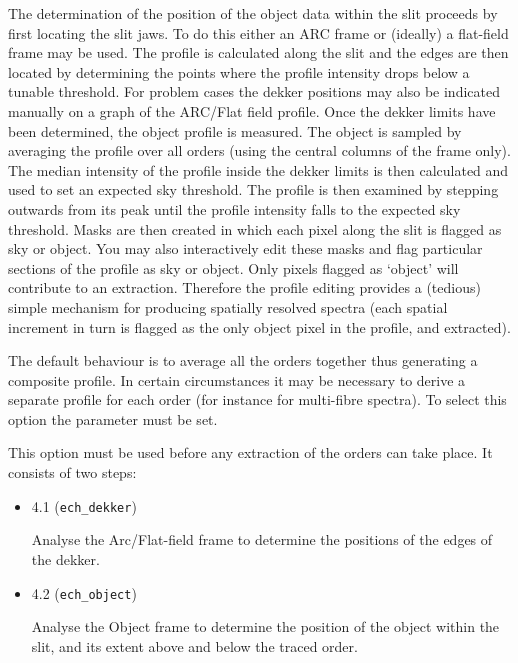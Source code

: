 The determination of the position of the object data within the slit
proceeds by first locating the slit jaws. To do this either an ARC frame
or (ideally) a flat-field frame may be used. The profile is calculated
along the slit and the edges are then located by determining the points
where the profile intensity drops below a tunable threshold. For
problem cases the dekker positions may also be indicated manually on a
graph of the ARC/Flat field profile.
Once the dekker limits have been determined, the object profile is
measured. The object is sampled by averaging the profile over all orders
(using the central columns of the frame only). The median intensity of
the profile inside the dekker limits is then calculated and used to set
an expected sky threshold. The profile is then examined by stepping
outwards from its peak until the profile intensity falls to the expected
sky threshold.
Masks are then created in which
each pixel along the slit is flagged as sky or object. You may also
interactively edit these masks and flag particular sections of the
profile as sky or object. Only pixels flagged as `object' will
contribute to an extraction.
Therefore the profile editing provides a (tedious) simple mechanism for
producing spatially resolved spectra (each spatial increment in turn is
flagged as the only object pixel in the profile, and extracted).

The default behaviour is to average all the orders together thus
generating a composite profile. In certain circumstances it may be
necessary to derive a separate profile for each order (for instance for
multi-fibre spectra).  To select this option the parameter
 must be set.

This option must be used before any extraction of the orders can take
place. It consists of two steps:

\begin{itemize}

\item {} {4.1} (\verb+ech_dekker+)

      Analyse the Arc/Flat-field frame to determine the positions
      of the edges of the dekker.

\item {} {4.2} (\verb+ech_object+)

      Analyse the Object frame to determine the position of the
      object within the slit, and its extent above and below the
      traced order.

\end{itemize}

